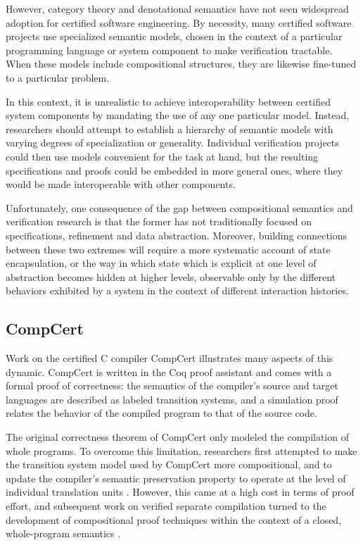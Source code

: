 \documentclass[acmsmall,screen,review,anonymous]{acmart}
\begin{document}
However,
category theory and denotational semantics
have not seen widespread adoption
for certified software engineering.
By necessity,
many certified software projects use
specialized semantic models,
chosen in the context of a particular
programming language or system component
to make verification tractable.
When these models include compositional structures,
they are likewise fine-tuned to a particular problem.

In this context,
it is unrealistic to achieve interoperability between
certified system components
by mandating the use of any one particular model.
Instead,
researchers should attempt to establish
a hierarchy of semantic models
with varying degrees of specialization or generality.
Individual verification projects could then
use models convenient for the task at hand,
but the resulting specifications and proofs
could be embedded in more general ones,
where they would be made interoperable
with other components.

Unfortunately,
one consequence of the gap between
compositional semantics and verification research
is that the former has not traditionally focused on
specifications, refinement and data abstraction.
Moreover,
building connections between these two extremes
will require a more systematic account of state encapsulation,
or the way in which state which is explicit at one level of abstraction
becomes hidden at higher levels,
observable only by the different behaviors exhibited by a system
in the context of different interaction histories.


\subsection{CompCert}

Work on
the certified C compiler CompCert \cite{compcert}
illustrates many aspects of this dynamic.
CompCert is written in the Coq proof assistant
and comes with a formal proof of correctness:
the semantics of the compiler's source and target languages
are described as labeled transition systems,
and a simulation proof
relates the behavior of the compiled program
to that of the source code.

The original correctness theorem of CompCert
only modeled the compilation of whole programs.
To overcome this limitation,
researchers first attempted to make
the transition system model used by CompCert
more compositional,
and to update the compiler's semantic preservation property
to operate at the level of individual translation units
\cite{compcompcert}.
However,
this came at a high cost in terms of proof effort,
and subsequent work on verified separate compilation
turned to the development of compositional proof techniques
within the context of a closed, whole-program semantics
\cite{sepcompcert}.
\end{document}
